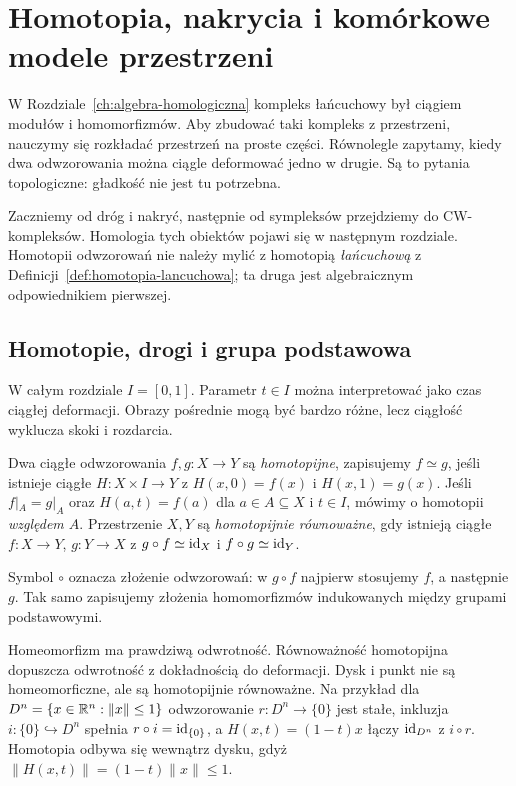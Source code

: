 \chapter{Homotopia, nakrycia i komórkowe modele przestrzeni}
\label{ch:topologia-algebraiczna-podstawy}

W Rozdziale~\ref{ch:algebra-homologiczna} kompleks łańcuchowy
był ciągiem modułów i homomorfizmów. Aby zbudować taki
kompleks z przestrzeni, nauczymy się rozkładać przestrzeń
na proste części. Równolegle zapytamy, kiedy dwa odwzorowania
można ciągle deformować jedno w drugie. Są to pytania
topologiczne: gładkość nie jest tu potrzebna.

Zaczniemy od dróg i nakryć, następnie od sympleksów
przejdziemy do CW-kompleksów. Homologia tych obiektów
pojawi się w następnym rozdziale. Homotopii odwzorowań
nie należy mylić z homotopią \emph{łańcuchową}
z Definicji~\ref{def:homotopia-lancuchowa};
ta druga jest algebraicznym odpowiednikiem pierwszej.

\section{Homotopie, drogi i grupa podstawowa}
\label{sec:homotopie-pi1}

W całym rozdziale $I=[0,1]$. Parametr $t\in I$
można interpretować jako czas ciągłej deformacji.
Obrazy pośrednie mogą być bardzo różne, lecz
ciągłość wyklucza skoki i rozdarcia.

\begin{definicja}
\label{def:homotopia-topologiczna}
Dwa ciągłe odwzorowania $f,g:X\to Y$ są
\emph{homotopijne}, zapisujemy $f\simeq g$,
jeśli istnieje ciągłe $H:X\times I\to Y$ z
$H(x,0)=f(x)$ i $H(x,1)=g(x)$.
Jeśli $f|_A=g|_A$ oraz $H(a,t)=f(a)$
dla $a\in A\subseteq X$ i $t\in I$,
mówimy o homotopii \emph{względem $A$}.
Przestrzenie $X,Y$ są \emph{homotopijnie
równoważne}, gdy istnieją ciągłe $f:X\to Y$,
$g:Y\to X$ z $g\circ f\simeq\mathrm{id}_X$ i
$f\circ g\simeq\mathrm{id}_Y$.
\end{definicja}

Symbol $\circ$ oznacza złożenie odwzorowań:
w $g\circ f$ najpierw stosujemy $f$, a następnie $g$.
Tak samo zapisujemy złożenia homomorfizmów indukowanych
między grupami podstawowymi.

Homeomorfizm ma prawdziwą odwrotność.
Równoważność homotopijna dopuszcza odwrotność
z dokładnością do deformacji. Dysk i punkt
nie są homeomorficzne, ale są homotopijnie
równoważne.
Na przykład dla $D^n=\{x\in\mathbb{R}^n:\|x\|\leq1\}$ odwzorowanie
$r:D^n\to\{0\}$ jest stałe, inkluzja
$i:\{0\}\hookrightarrow D^n$ spełnia $r\circ i=\mathrm{id}_{\{0\}}$,
a $H(x,t)=(1-t)x$ łączy $\mathrm{id}_{D^n}$ z $i\circ r$.
Homotopia odbywa się wewnątrz dysku, gdyż
$\|H(x,t)\|=(1-t)\|x\|\leq1$.

